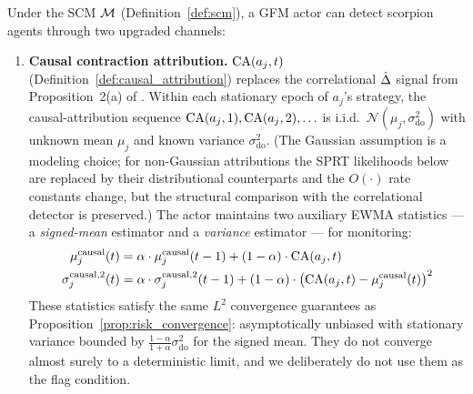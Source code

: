 \begin{proposition}
\label{prop:causal_scorpion}
Under the SCM $\mathcal{M}$ (Definition~\ref{def:scm}), a GFM actor can detect
    scorpion agents through two upgraded channels:
\begin{enumerate}
\item[\textbf{(a)}] \textbf{Causal contraction attribution.}
    $\mathrm{CA}(a_j, t)$ (Definition~\ref{def:causal_attribution}) replaces
    the correlational $\hat{\Delta}$ signal from Proposition~2(a) of
    \citet{lasser2026gfm}. Within each stationary epoch of $a_j$'s
    strategy, the causal-attribution sequence
    $\mathrm{CA}(a_j, 1), \mathrm{CA}(a_j, 2), \ldots$ is i.i.d.\
    $\mathcal{N}(\mu_j, \sigma_{\mathrm{do}}^2)$ with unknown mean
    $\mu_j$ and known variance $\sigma_{\mathrm{do}}^2$. (The Gaussian
    assumption is a modeling choice; for non-Gaussian attributions the
    SPRT likelihoods below are replaced by their distributional
    counterparts and the $O(\cdot)$ rate constants change, but the
    structural comparison with the correlational detector is
    preserved.) The
    actor maintains two auxiliary EWMA statistics --- a
    \emph{signed-mean} estimator and a \emph{variance} estimator ---
    for monitoring:
\begin{align}
\label{eq:causal_trust_mean}
\mu_j^{\mathrm{causal}}(t) &= \alpha \cdot \mu_j^{\mathrm{causal}}(t-1)
    + (1 - \alpha) \cdot \mathrm{CA}(a_j, t) \\
\label{eq:causal_trust_var}
\sigma_j^{\mathrm{causal},2}(t) &= \alpha \cdot
    \sigma_j^{\mathrm{causal},2}(t-1)
    + (1 - \alpha) \cdot
    \bigl(\mathrm{CA}(a_j, t) - \mu_j^{\mathrm{causal}}(t)\bigr)^2
\end{align}
    These statistics satisfy the same $L^2$ convergence guarantees as
    Proposition~\ref{prop:risk_convergence}: asymptotically unbiased
    with stationary variance bounded by
    $\tfrac{1 - \alpha}{1 + \alpha} \sigma_{\mathrm{do}}^2$ for the
    signed mean. They do not converge almost surely to a deterministic
    limit, and we deliberately do not use them as the flag condition.


\end{enumerate}
\end{proposition}
